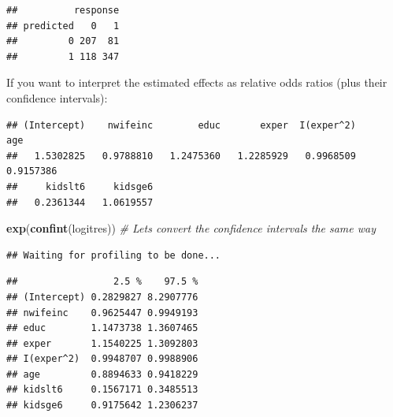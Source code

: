 \documentclass[]{book}
\newenvironment{Shaded}{\begin{snugshade}}{\end{snugshade}}
\newcommand{\CommentTok}[1]{\textcolor[rgb]{0.56,0.35,0.01}{\textit{#1}}}
\newcommand{\DataTypeTok}[1]{\textcolor[rgb]{0.13,0.29,0.53}{#1}}
\newcommand{\DecValTok}[1]{\textcolor[rgb]{0.00,0.00,0.81}{#1}}
\newcommand{\KeywordTok}[1]{\textcolor[rgb]{0.13,0.29,0.53}{\textbf{#1}}}
\newcommand{\NormalTok}[1]{#1}
\newcommand{\OperatorTok}[1]{\textcolor[rgb]{0.81,0.36,0.00}{\textbf{#1}}}
\newcommand{\StringTok}[1]{\textcolor[rgb]{0.31,0.60,0.02}{#1}}
\begin{document}
\begin{Shaded}
\end{Shaded}

\begin{verbatim}
##          response
## predicted   0   1
##         0 207  81
##         1 118 347
\end{verbatim}

If you want to interpret the estimated effects as relative odds ratios (plus their confidence intervals):

\begin{Shaded}
\end{Shaded}

\begin{verbatim}
## (Intercept)    nwifeinc        educ       exper  I(exper^2)         age 
##   1.5302825   0.9788810   1.2475360   1.2285929   0.9968509   0.9157386 
##     kidslt6     kidsge6 
##   0.2361344   1.0619557
\end{verbatim}

\begin{Shaded}
\begin{Highlighting}[]
\KeywordTok{exp}\NormalTok{(}\KeywordTok{confint}\NormalTok{(logitres)) }\CommentTok{# Lets convert the confidence intervals the same way}
\end{Highlighting}
\end{Shaded}

\begin{verbatim}
## Waiting for profiling to be done...
\end{verbatim}

\begin{verbatim}
##                 2.5 %    97.5 %
## (Intercept) 0.2829827 8.2907776
## nwifeinc    0.9625447 0.9949193
## educ        1.1473738 1.3607465
## exper       1.1540225 1.3092803
## I(exper^2)  0.9948707 0.9988906
## age         0.8894633 0.9418229
## kidslt6     0.1567171 0.3485513
## kidsge6     0.9175642 1.2306237
\end{verbatim}
\end{document}
